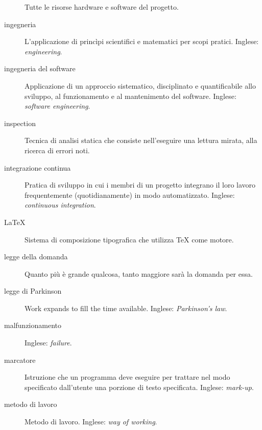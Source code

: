 \documentclass[a4paper]{article}
\begin{document}
\begin{description}
			Tutte le risorse hardware e software del progetto.
			
	\item[ingegneria] 

			L'applicazione di princìpi scientifici e matematici per scopi pratici. Inglese: \emph{engineering}.
			
	\item[ingegneria del software] 

			Applicazione di un approccio sistematico, disciplinato e quantificabile allo sviluppo, al funzionamento e al mantenimento del software. Inglese: \emph{software engineering}.
			
	\item[inspection] 

			Tecnica di analisi statica che consiste nell'eseguire una lettura mirata, alla ricerca di errori noti.
			
	\item[integrazione continua] 

			Pratica di sviluppo in cui i membri di un progetto integrano il loro lavoro frequentemente (quotidianamente) in modo automatizzato. Inglese: \emph{continuous integration}.
			
	\item[LaTeX] 

			Sistema di composizione tipografica che utilizza TeX come motore.
			
	\item[legge della domanda] 

			Quanto più è grande qualcosa, tanto maggiore sarà la domanda per essa.
			
	\item[legge di Parkinson] 

			Work expands to fill the time available. Inglese: \emph{Parkinson's law}.
			
	\item[malfunzionamento] 

			 Inglese: \emph{failure}.
			
	\item[marcatore] 

			Istruzione che un programma deve eseguire per trattare nel modo specificato dall'utente una porzione di testo specificata. Inglese: \emph{mark-up}.
			
	\item[metodo di lavoro] 

			Metodo di lavoro. Inglese: \emph{way of working}.
			

\end{description}
\end{document}
